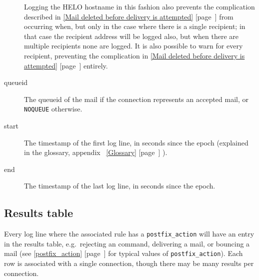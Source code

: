 \documentclass[a4paper,12pt,draft]{article}
\newcommand{\refwithpage}[1]{%
    \empty{}\ref{#1} [page~\pageref{#1}]%
}
\newcommand{\sectionref}[1]{%
    \textsection{}\refwithpage{#1}%
}
\begin{document}
\begin{description}
        Logging the HELO hostname in this fashion also prevents the
        complication described in \sectionref{Mail deleted before delivery
        is attempted} from occurring when, but only in the case where there
        is a single recipient; in that case the recipient address will be
        logged also, but when there are multiple recipients none are
        logged.  It is also possible to warn for every recipient,
        preventing the complication in \sectionref{Mail deleted before
        delivery is attempted} entirely.

    \item [queueid] The queueid of the mail if the connection represents an
        accepted mail, or \texttt{NOQUEUE} otherwise.

    \item [start] The timestamp of the first log line, in seconds since the
        epoch (explained in the glossary, appendix~\refwithpage{Glossary}).

    \item [end] The timestamp of the last log line, in seconds since the
        epoch.

\end{description}

\subsection{Results table}

\label{results table}

Every log line where the associated rule has a \texttt{postfix\_action}
will have an entry in the results table, e.g.\ rejecting an \SMTP{}
command, delivering a mail, or bouncing a mail (see
\sectionref{postfix_action} for typical values of
\texttt{postfix\_action}).  Each row is associated with a single
connection, though there may be many results per connection.
\end{document}
